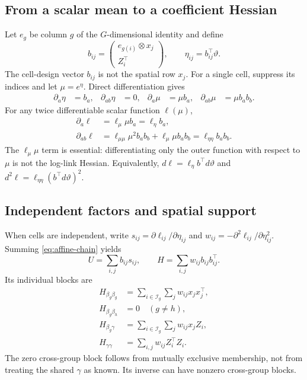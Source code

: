 \documentclass[11pt,a4paper]{article}
\numberwithin{equation}{section}
\begin{document}
\subsection{From a scalar mean to a coefficient Hessian}
Let $e_g$ be column $g$ of the $G$-dimensional identity and define
\begin{equation}
 b_{ij}=\begin{pmatrix}e_{g(i)}\otimes x_j\\{Z_i^\top}\end{pmatrix},
 \qquad \eta_{ij}=b_{ij}^\top\vartheta .
\end{equation}
The cell-design vector $b_{ij}$ is not the spatial row $x_j$.
For a single cell, suppress its indices and let $\mu=e^\eta$.
Direct differentiation gives
\begin{align}
 \partial_a\eta&=b_a,& \partial_{ab}\eta&=0,&
 \partial_a\mu&=\mu b_a,& \partial_{ab}\mu&=\mu b_ab_b.
\end{align}
For any twice differentiable scalar function $\ell(\mu)$,
\begin{align}
 \partial_a\ell&=\ell_\mu\mu b_a=\ell_\eta b_a,\\
 \partial_{ab}\ell
 &=\ell_{\mu\mu}\mu^2b_ab_b+\ell_\mu\mu b_ab_b
 =\ell_{\eta\eta}b_ab_b. \label{eq:affine-chain}
\end{align}
The $\ell_\mu\mu$ term is essential: differentiating only the outer
function with respect to $\mu$ is not the log-link Hessian.
Equivalently, $d\ell=\ell_\eta b^\top d\vartheta$ and
$d^2\ell=\ell_{\eta\eta}(b^\top d\vartheta)^2$.

\subsection{Independent factors and spatial support}
When cells are independent, write
$s_{ij}=\partial\ell_{ij}/\partial\eta_{ij}$ and
$w_{ij}=-\partial^2\ell_{ij}/\partial\eta_{ij}^2$.
Summing \eqref{eq:affine-chain} yields
\begin{equation}
 U=\sum_{i,j}b_{ij}s_{ij},\qquad
 H=\sum_{i,j}w_{ij}b_{ij}b_{ij}^\top. \label{eq:cell-assembly}
\end{equation}
Its individual blocks are
\begin{align}
 H_{\beta_g\beta_g}
 &=\sum_{i\in\mathcal I_g}\sum_jw_{ij}x_jx_j^\top,\\
 H_{\beta_g\beta_h}&=0\quad(g\ne h),\\
 H_{\beta_g\gamma}
 &=\sum_{i\in\mathcal I_g}\sum_jw_{ij}x_j{Z_i},\\
 H_{\gamma\gamma}&=\sum_{i,j}w_{ij}{Z_i^\top}{Z_i}. \label{eq:group-blocks}
\end{align}
The zero cross-group block follows from mutually exclusive membership,
not from treating the shared $\gamma$ as known. Its inverse can have
nonzero cross-group blocks.
\end{document}
